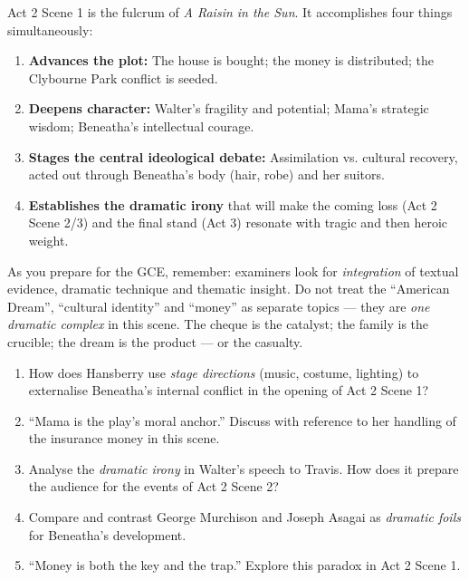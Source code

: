 \documentclass[11pt]{article}
\newcommand{\cle}[1]{{\popxbold\color{popdark}#1}}
\newcounter{popsec}
\newcounter{popsub}
\newcommand{\courssub}[1]{%
  \stepcounter{popsub}%
  \par\vspace{9pt}\noindent{\popxbold\fontsize{11.5}{13}\selectfont\color{popink}{\color{poporange}\thepopsec.\thepopsub}\hspace{6pt}#1}\par\nopagebreak\vspace{4pt}
}
\begin{document}
\courssub{Summary: Why This Scene Matters}

Act 2 Scene 1 is the \cle{fulcrum} of \emph{A Raisin in the Sun}. It accomplishes four things simultaneously:
\begin{enumerate}
\item \textbf{Advances the plot:} The house is bought; the money is distributed; the Clybourne Park conflict is seeded.
\item \textbf{Deepens character:} Walter's fragility and potential; Mama's strategic wisdom; Beneatha's intellectual courage.
\item \textbf{Stages the central ideological debate:} Assimilation vs. cultural recovery, acted out through Beneatha's body (hair, robe) and her suitors.
\item \textbf{Establishes the dramatic irony} that will make the coming loss (Act 2 Scene 2/3) and the final stand (Act 3) resonate with tragic and then heroic weight.
\end{enumerate}

As you prepare for the GCE, remember: examiners look for \emph{integration} of textual evidence, dramatic technique and thematic insight. Do not treat the ``American Dream'', ``cultural identity'' and ``money'' as separate topics — they are \emph{one dramatic complex} in this scene. The cheque is the catalyst; the family is the crucible; the dream is the product — or the casualty.

\begin{exercice}
\begin{enumerate}
\item How does Hansberry use \emph{stage directions} (music, costume, lighting) to externalise Beneatha's internal conflict in the opening of Act 2 Scene 1?
\item ``Mama is the play's moral anchor.'' Discuss with reference to her handling of the insurance money in this scene.
\item Analyse the \emph{dramatic irony} in Walter's speech to Travis. How does it prepare the audience for the events of Act 2 Scene 2?
\item Compare and contrast George Murchison and Joseph Asagai as \emph{dramatic foils} for Beneatha's development.
\item ``Money is both the key and the trap.'' Explore this paradox in Act 2 Scene 1.
\end{enumerate}
\end{exercice}
\end{document}
